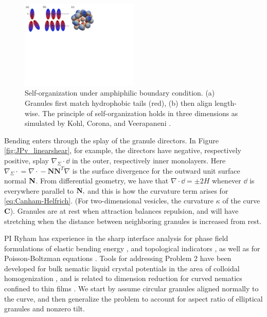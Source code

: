 \begin{figure}
  \vspace{-5pt}
\centerline{\includegraphics[width=0.5\textwidth]{figures/SA1Figures/AmphiphilicAssembly.pdf}}
  \vspace{-5pt}
\caption{\label{fig:amphiphilic_assembly}
Self-organization under amphiphilic boundary condition.
(a) Granules first match hydrophobic tails (red),
(b) then align length-wise.
The principle of self-organization holds in three dimensions 
as simulated by Kohl, Corona, and Veerapaneni
\cite{koh-cor-che-vee2021}.}
\end{figure}
Bending enters through the splay of the
granule directors.
In Figure \ref{fig:JPv_linearshear},
for example, the directors have negative, respectively positive,
splay $\nabla_{\Sigma} \cdot \dd$
in the outer, respectively inner monolayers.
Here $\nabla_{\Sigma}\cdot{} = \nabla \cdot {} - \mathbf{N}\mathbf{N}^T \nabla$
is the surface divergence for the outward unit surface normal $\mathbf{N}$.
From differential geometry, we have that 
$\nabla\cdot \dd = \pm 2H$ whenever
$\dd$ is everywhere parallel to $\mathbf{N},$
and this is how the
curvature term arises for \eqref{eq:Canham-Helfrich}.
(For two-dimensional vesicles, the curvature $\kappa$ of the curve $\mathbf{C}$).
Granules are at rest when attraction balances repulsion, 
and will have stretching when the distance between
neighboring granules is increased from rest.

PI Ryham has experience in the sharp interface analysis
for phase field formulations of elastic
bending energy \cite{0951-7715-18-3-016,Du05}, and
topological indicators \cite{DuEuler},
as well as for Poisson-Boltzman equations \cite{Lee2018,1531-3492_2006_2_357}.  Tools for addressing Problem 2 have
been developed for bulk nematic liquid
crystal potentials in the area of colloidal homogenization
\cite{Canevari2019DesignOE,doi:10.1137/18M1163919,doi:10.1137/18M1163919, BERLYAND200597,doi:10.1137/130910348},
and is related to 
dimension reduction for curved nematics confined to thin films
\cite{Golovaty2017DimensionRF, Golovaty2015DimensionRF,
doi:10.1142/S0218202516500470, FoFrLe07}.
We start by assume circular granules aligned normally to the curve,
and then generalize the problem to account for aspect ratio of
elliptical granules and nonzero tilt. 

